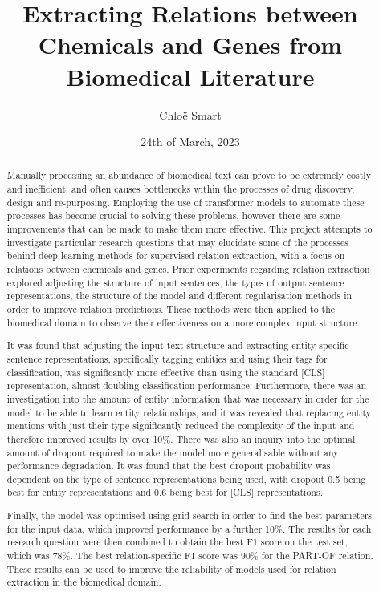 \documentclass{l4proj}
\begin{document}
\title{Extracting Relations between Chemicals and Genes from Biomedical Literature}
\author{Chlo\"e Smart}
\date{24th of March, 2023}

\maketitle

\begin{abstract}
    Manually processing an abundance of biomedical text can prove to be extremely costly and inefficient, and often causes bottlenecks within the processes of drug discovery, design and re-purposing. Employing the use of transformer models to automate these processes has become crucial to solving these problems, however there are some improvements that can be made to make them more effective. This project attempts to investigate particular research questions that may elucidate some of the processes behind deep learning methods for supervised relation extraction, with a focus on relations between chemicals and genes. Prior experiments regarding relation extraction explored adjusting the structure of input sentences, the types of output sentence representations, the structure of the model and different regularisation methods in order to improve relation predictions. These methods were then applied to the biomedical domain to observe their effectiveness on a more complex input structure. 
    
    It was found that adjusting the input text structure and extracting entity specific sentence representations, specifically tagging entities and using their tags for classification, was significantly more effective than using the standard [CLS] representation, almost doubling classification performance. Furthermore, there was an investigation into the amount of entity information that was necessary in order for the model to be able to learn entity relationships, and it was revealed that replacing entity mentions with just their type significantly reduced the complexity of the input and therefore improved results by over 10\%. There was also an inquiry into the optimal amount of dropout required to make the model more generalisable without any performance degradation. It was found that the best dropout probability was dependent on the type of sentence representations being used, with dropout 0.5 being best for entity representations and 0.6 being best for [CLS] representations. 
    
    Finally, the model was optimised using grid search in order to find the best parameters for the input data, which improved performance by a further 10\%. The results for each research question were then combined to obtain the best F1 score on the test set, which was 78\%. The best relation-specific F1 score was 90\% for the PART-OF relation. These results can be used to improve the reliability of models used for relation extraction in the biomedical domain.
    
\end{abstract}
\end{document}
